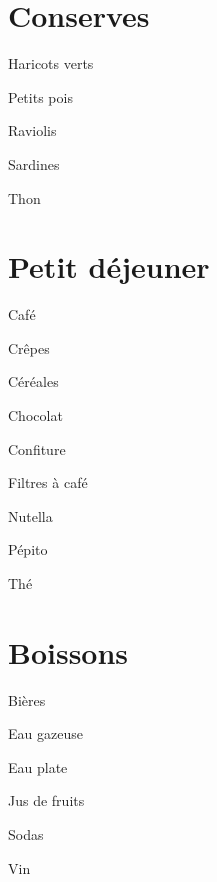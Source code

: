 \documentclass[8pt,landscape,a4paper]{article}
\begin{document}
\begin{multicols*}{4}
    \section{Conserves}
    \begin{todolist}
    \item Haricots verts
    \item Petits pois 
    \item Raviolis
    \item Sardines
    \item Thon
    \item 
    \item 
    \item 
    \item 
    \item 
    \item 
    \end{todolist}
    
    \section{Petit déjeuner}
    \begin{todolist}
    \item Café
    \item Crêpes
    \item Céréales 
    \item Chocolat
    \item Confiture
    \item Filtres à café
    \item Nutella 
    \item Pépito
    \item Thé
    \item 
    \item 
    \item 
    \item 
    \end{todolist}

    \section{Boissons}
    \begin{todolist}
    \item Bières
    \item Eau gazeuse
    \item Eau plate
    \item Jus de fruits
    \item Sodas
    \item Vin
    \item 
    \item 
    \item 
    \item 
    \end{todolist}


\end{multicols*}
\end{document}
